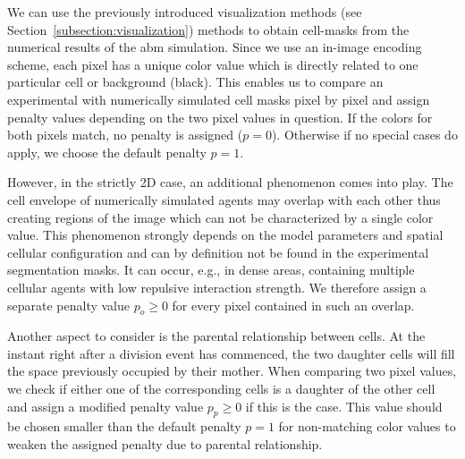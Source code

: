 We can use the previously introduced visualization methods (see
Section~\ref{subsection:visualization}) methods to obtain cell-masks from the numerical results of
the \ac{abm} simulation.
Since we use an in-image encoding scheme, each pixel has a unique color value which is directly
related to one particular cell or background (black).
This enables us to compare an experimental with numerically simulated cell masks pixel by pixel and
assign penalty values depending on the two pixel values in question.
If the colors for both pixels match, no penalty is assigned ($p=0$).
Otherwise if no special cases do apply, we choose the default penalty $p=1$.

However, in the strictly 2D case, an additional phenomenon comes into play.
The cell envelope of numerically simulated agents may overlap with each other thus creating regions
of the image which can not be characterized by a single color value.
This phenomenon strongly depends on the model parameters and spatial cellular configuration and can
by definition not be found in the experimental segmentation masks.
It can occur, e.g., in dense areas, containing multiple cellular agents with low repulsive
interaction strength.
We therefore assign a separate penalty value $p_o\geq0$ for every pixel contained in such an
overlap.

Another aspect to consider is the parental relationship between cells.
At the instant right after a division event has commenced, the two daughter cells will fill the
space previously occupied by their mother.
When comparing two pixel values, we check if either one of the corresponding cells is a daughter of
the other cell and assign a modified penalty value $p_p\geq0$ if this is the case.
This value should be chosen smaller than the default penalty $p=1$ for non-matching color
values to weaken the assigned penalty due to parental relationship.

